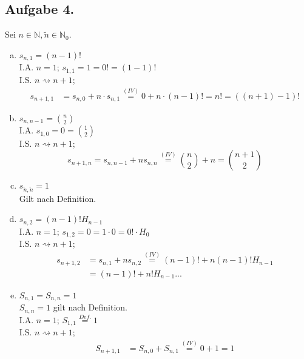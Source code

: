 \documentclass[11pt,a4paper,ngerman]{article}
\begin{document}
\subsection*{Aufgabe 4.}
Sei $n \in \mathbb{N}, \tilde{n} \in \mathbb{N}_0$.
\begin{enumerate}[a)]
\item $s_{n,1} = (n-1)!$ \\
I.A. $n=1$; $s_{1,1} = 1 = 0! = (1-1)!$ \\
I.S. $n \rightsquigarrow n+1$;
  \begin{equation*}\begin{split}
    s_{n+1,1} &= s_{n,0} + n \cdot s_{n,1} 
              \stackrel{(IV)}{=} 0 + n \cdot (n-1)! 
              = n! = ((n+1)-1)!
  \end{split}\end{equation*}
\item $s_{n,n-1} = \binom{n}{2}$ \\
I.A. $s_{1,0} = 0 = \binom{1}{2}$ \\
I.S. $n \rightsquigarrow n+1$;
  \begin{equation*}s_{n+1,n} = s_{n,n-1} + n s_{n,n} \stackrel{(IV)}{=} \binom{n}{2} + n = \binom{n+1}{2}\end{equation*}
\item $s_{\tilde{n},\tilde{n}} = 1$ \\
Gilt nach Definition.
\item $s_{n,2} = (n-1)! H_{n-1}$ \\
I.A. $n=1$; $s_{1,2} = 0 = 1 \cdot 0 = 0! \cdot H_{0} $ \\
I.S. $n \rightsquigarrow n+1$;
  \begin{equation*}\begin{split}
    s_{n+1,2} &= s_{n,1} + n s_{n,2} \stackrel{(IV)}{=} (n-1)! + n (n-1)! H_{n-1} \\
              &=  (n-1)! + n! H_{n-1} ...
  \end{split}\end{equation*}
\item $S_{n,1} = S_{n,n} = 1$ \\
$S_{n,n} = 1$ gilt nach Definition. \\
I.A. $n=1$; $S_{1,1} \stackrel{Def.}{=} 1 $ \\
I.S. $n \rightsquigarrow n+1$;
  \begin{equation*}\begin{split}
    S_{n+1,1} &= S_{n,0} + S_{n,1} \stackrel{(IV)}{=}0 + 1 = 1\end{split}\end{equation*}

\end{enumerate}
\end{document}
